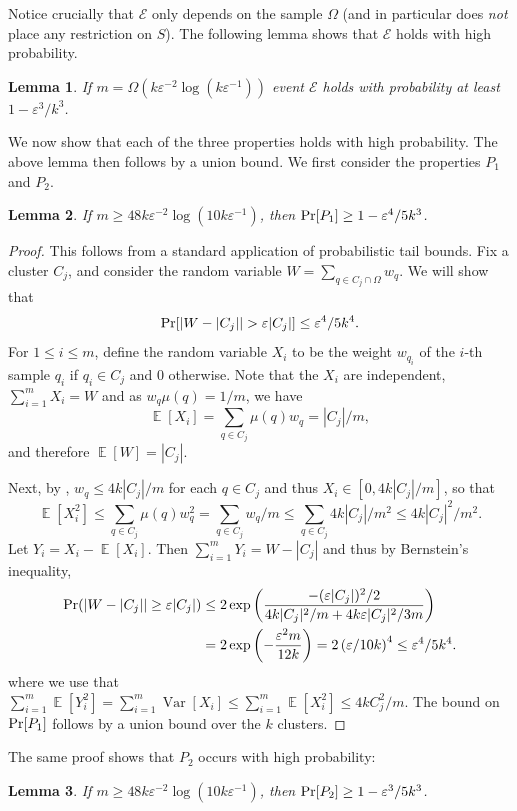 \documentclass[11pt]{article}
\newtheorem{lemma}{Lemma}[section]
\theoremstyle{restate}
\theoremstyle{definition}
\newcommand{\eps}{\ensuremath{\varepsilon}}
\DeclareMathOperator*{\var}{\mathrm{Var}}
\DeclareMathOperator*{\Prob}{\ensuremath{\textnormal{Pr}}}
\renewcommand{\Pr}{\Prob}
\newcommand{\E}{\mathop{\mathbb{E}}}
\newcommand{\csize}{m}
\begin{document}
Notice crucially that $\mathcal{E}$ only depends on the sample $\Omega$ (and in particular does \textit{not} place any restriction on $S$).
The following lemma shows that $\mathcal{E}$ holds with high probability. 
\begin{lemma}
    If $m= \Omega(k\eps^{-2}\log (k \eps^{-1}))$ event $\mathcal{E}$ holds with probability at least $1-\eps^3/k^3$.
\end{lemma}
\noindent We now show that each of the three properties holds with high probability. The above lemma then follows by a union bound. We first consider the properties $P_1$ and $P_2$.
\begin{lemma}
 If $\csize \geq 48 k\eps^{-2} \log(10k\eps^{-1})$, then 
 $\Pr[P_1] \geq 1-\eps^4/5k^3$.
\end{lemma}
\begin{proof}
This follows from a standard application of probabilistic tail bounds.
 Fix a cluster $C_j$, and consider the random variable $W=\sum_{q \in C_j\cap \Omega} w_q$. We will show that
 \[  \Pr[ |W-|C_j| | > \eps |C_j|] \leq \eps^4/5k^4.\]
For $1 \leq i \leq \csize$, define the random variable $X_i$ to be the weight $w_{q_i}$ of the $i$-th sample $q_i$ if $q_i \in C_j$ and $0$ otherwise. Note that the $X_i$ are independent, $\sum_{i=1}^\csize  X_i = W$ and as  $w_q \mu(q)=1/\csize$, we have
\[\E[X_i] = \sum_{q \in C_j}  \mu(q) w_q= |C_j|/\csize,\] and therefore $ \E[W] = |C_j|$. 

Next, by , $w_q \leq 4k|C_j|/\csize$ for each $q\in C_j$ and thus $X_i \in [0,4k|C_j|/\csize]$, so that
\[ \E[X_i^2] \leq  \sum_{q \in C_j} \mu(q) w_q^2 = \sum_{q \in C_j} w_q/ \csize\leq \sum_{q \in C_j} 4k|C_j|/\csize^2  \leq 4k|C_j|^2 /\csize^2. \]
Let $Y_i = X_i - \E[X_i]$. Then $\sum_{i=1}^\csize Y_i = W- |C_j|$  and thus by Bernstein's inequality,
	\begin{align*}
		\Pr (|W -|C_j|| \geq \eps |C_j|) &
		\leq 2\exp\left(\frac{-(\eps|C_j|)^2/2}{4k|C_j|^2 /\csize + 4k\eps|C_j|^2/3\csize}\right) \\ 
		&= 2\exp\left(- \frac{\eps^2 \csize}{12k}\right) = 2 \left(\eps / 10k\right)^4 \leq \eps^4/5k^4.
	\end{align*}
where we use that $\sum_{i=1}^\csize \E[Y_i^2] = \sum_{i=1}^\csize \var[X_i] \leq  \sum_{i=1}^\csize \E[X_i^2] \leq 4kC_j^2/\csize$.
The bound on $\Pr[P_1]$ follows by a union bound over the $k$ clusters. 
\end{proof}
The same proof shows that $P_2$ occurs with high probability:
\begin{lemma}
     If $\csize \geq 48 k\eps^{-2} \log(10k\eps^{-1})$, then 
 $\Pr[P_2] \geq 1-\eps^3/5k^3$.
\end{lemma}
\end{document}
